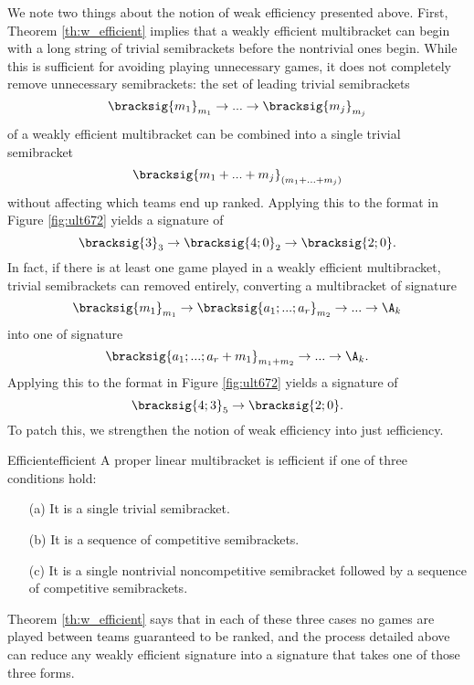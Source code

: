 {    
   

    We note two things about the notion of weak efficiency presented above. First, Theorem \ref{th:w_efficient} implies that a weakly efficient multibracket can begin with a long string of trivial semibrackets before the nontrivial ones begin. While this is sufficient for avoiding playing unnecessary games, it does not completely remove unnecessary semibrackets: the set of leading trivial semibrackets $$\bracksig{m_1}_{m_1} \to ... \to \bracksig{m_{j}}_{m_{j}}$$ of a weakly efficient multibracket can be combined into a single trivial semibracket $$\bracksig{m_1 + ... + m_{j}}_{(m_1 + ... + m_{j})}$$ without affecting which teams end up ranked. Applying this to the format in Figure \ref{fig:ult672} yields a signature of $$\bracksig{3}_3 \to \bracksig{4;0}_2 \to \bracksig{2;0}.$$ 
    In fact, if there is at least one game played in a weakly efficient multibracket, trivial semibrackets can removed entirely, converting a multibracket of signature $$\bracksig{m_1}_{m_1} \to \bracksig{a_1; ...; a_r}_{m_2} \to ... \to \A_k$$ into one of signature $$\bracksig{a_1; ...; a_r + m_1}_{m_1 + m_2} \to ... \to \A_k.$$ 
    Applying this to the format in Figure \ref{fig:ult672} yields a signature of $$\bracksig{4;3}_5 \to \bracksig{2;0}.$$
    To patch this, we strengthen the notion of weak efficiency into just \i{efficiency.}

    \begin{definition}{Efficient}{efficient}
        A proper linear multibracket is \i{efficient} if one of three conditions hold:
        \begin{enumerate}
            \item[(a)] It is a single trivial semibracket.
            \item[(b)] It is a sequence of competitive semibrackets.
            \item[(c)] It is a single nontrivial noncompetitive semibracket followed by a sequence of competitive semibrackets.
        \end{enumerate}
    \end{definition}

    Theorem \ref{th:w_efficient} says that in each of these three cases no games are played between teams guaranteed to be ranked, and the process detailed above can reduce any weakly efficient signature into a signature that takes one of those three forms.

}

